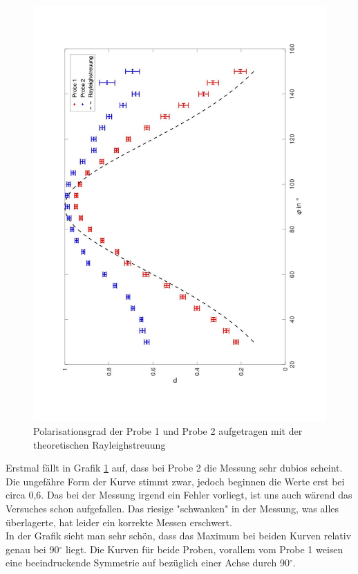 \begin{figure}[h]
    \captionsetup{justification=centering,margin=2cm}
    \centering
    \includegraphics[width = \linewidth]{Bilder/Polarisattionsgrad.jpg}
    \caption{Polarisationsgrad der Probe 1 und Probe 2 aufgetragen mit der theoretischen Rayleighstreuung}
    \label{PolarisationsgradBild}
\end{figure}




Erstmal fällt in Grafik \ref{PolarisationsgradBild} auf, dass bei Probe 2 die Messung sehr dubios scheint. Die ungefähre Form der Kurve 
stimmt zwar, jedoch beginnen die Werte erst bei circa 0,6. Das bei der Messung irgend ein Fehler vorliegt, ist uns auch wärend das Versuches schon aufgefallen. Das 
riesige "schwanken" in der Messung, was alles überlagerte, hat leider ein korrekte Messen erschwert.\\
In der Grafik sieht man sehr schön, dass das Maximum bei beiden Kurven relativ genau bei 90$^{\circ}$ liegt. Die Kurven für beide Proben, vorallem vom Probe 1 
weisen eine beeindruckende Symmetrie auf bezüglich einer Achse durch 90$^{\circ}$.

